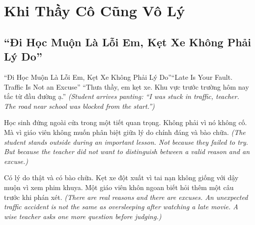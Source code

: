 
\chapter{Khi Thầy Cô Cũng Vô Lý}

\section{``Đi Học Muộn Là Lỗi Em, Kẹt Xe Không Phải Lý Do''}
\begin{truyen}{``Đi Học Muộn Là Lỗi Em, Kẹt Xe Không Phải Lý Do''}{``Late Is Your Fault. Traffic Is Not an Excuse''}
 ``Thưa thầy, em kẹt xe. Khu vực trước trường hôm nay tắc từ đầu đường ạ.''
\textit{(Student arrives panting: ``I was stuck in traffic, teacher. The road near school was blocked from the start.'')}




Học sinh đứng ngoài cửa trong một tiết quan trọng. Không phải vì nó không cố. Mà vì giáo viên không muốn phân biệt giữa lý do chính đáng và bào chữa.
\textit{(The student stands outside during an important lesson. Not because they failed to try. But because the teacher did not want to distinguish between a valid reason and an excuse.)}

\begin{baihoc}
Có lý do thật và có bào chữa. Kẹt xe đột xuất vì tai nạn không giống với dậy muộn vì xem phim khuya. Một giáo viên khôn ngoan biết hỏi thêm một câu trước khi phán xét.
\textit{(There are real reasons and there are excuses. An unexpected traffic accident is not the same as oversleeping after watching a late movie. A wise teacher asks one more question before judging.)}
\end{baihoc}
\end{truyen}

